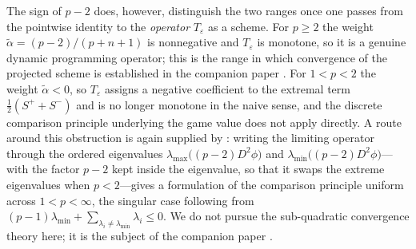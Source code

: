 \documentclass[12pt,reqno]{amsart}
\numberwithin{equation}{section}
\theoremstyle{plain}
\theoremstyle{definition}
\theoremstyle{remark}
\newcommand{\talpha}{\widetilde\alpha}
\newcommand{\Sp}{S^+}
\newcommand{\Sm}{S^-}
\begin{document}
The sign of $p-2$ does, however, distinguish the two ranges once one passes
from the pointwise identity to the \emph{operator} $T_\varepsilon$ as a
scheme. For $p\ge2$ the weight $\talpha=(p-2)/(p+n+1)$ is nonnegative and
$T_\varepsilon$ is monotone, so it is a genuine dynamic programming
operator; this is the range in which convergence of the projected scheme
is established in the companion paper \cite{Moosavi26}. For $1<p<2$ the
weight $\talpha<0$, so $T_\varepsilon$ assigns a negative coefficient to
the extremal term $\tfrac12(\Sp+\Sm)$ and is no longer monotone in the
naive sense, and the discrete comparison principle underlying the game
value does not apply directly. A route around this obstruction is again
supplied by \cite{MPRparabolic}: writing the limiting operator through the
ordered eigenvalues $\lambda_{\max}\bigl((p-2)D^2\phi\bigr)$ and
$\lambda_{\min}\bigl((p-2)D^2\phi\bigr)$---with the factor $p-2$ kept
inside the eigenvalue, so that it swaps the extreme eigenvalues when
$p<2$---gives a formulation of the comparison principle uniform across
$1<p<\infty$, the singular case following from
$(p-1)\lambda_{\min}+\sum_{\lambda_i\ne\lambda_{\min}}\lambda_i\le0$. We do
not pursue the sub-quadratic convergence theory here; it is the subject of
the companion paper \cite{Moosavi26}.





\end{document}
